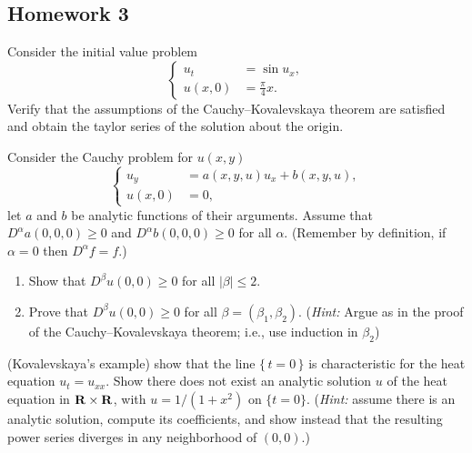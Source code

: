 \subsection{Homework 3}
\begin{problem}
  Consider the initial value problem
  \[
    \left\{
      \begin{aligned}
        u_t&=\sin u_x,\\
        u(x,0)&=\tfrac{\pi}{4}x.
      \end{aligned}
    \right.
  \]
  Verify that the assumptions of the Cauchy--Kovalevskaya theorem are
  satisfied and obtain the taylor series of the solution about the origin.
\end{problem}
\begin{solution*}
\end{solution*}

\begin{problem}
  Consider the Cauchy problem for \(u(x,y)\)
  \[
    \left\{
      \begin{aligned}
        u_y&=a(x, y, u)u_x+b(x,y,u),\\
        u(x,0)&=0,
      \end{aligned}
    \right.
  \]
  let \(a\) and \(b\) be analytic functions of their arguments. Assume that
  \(D^\alpha a(0,0,0)\geq 0\) and \(D^\alpha b(0,0,0)\geq 0\) for all
  \(\alpha\). (Remember by definition, if \(\alpha=0\) then
  \(D^\alpha f=f\).)
  \begin{enumerate}[label=(\alph*),noitemsep]
  \item Show that \(D^\beta u(0,0)\geq 0\) for all \(|\beta|\leq 2\).
  \item Prove that \(D^\beta u(0,0)\geq 0\) for all
    \(\beta=(\beta_1,\beta_2)\). (\emph{Hint:} Argue as in the proof of the
    Cauchy--Kovalevskaya theorem; i.e., use induction in \(\beta_2\))
  \end{enumerate}
\end{problem}
\begin{solution*}
\end{solution*}

\begin{problem}
  (Kovalevskaya's example) show that the line \(\{\,t=0\,\}\) is
  characteristic for the heat equation \(u_t=u_{xx}\). Show there does not
  exist an analytic solution \(u\) of the heat equation in
  \(\mathbf{R}\times\mathbf{R}\), with \(u=1/(1+x^2)\) on \(\{t=0\}\). (\emph{Hint:}
  assume there is an analytic solution, compute its coefficients, and show
  instead that the resulting power series diverges in any neighborhood of
  \((0,0)\).)
\end{problem}
\begin{solution*}
\end{solution*}


